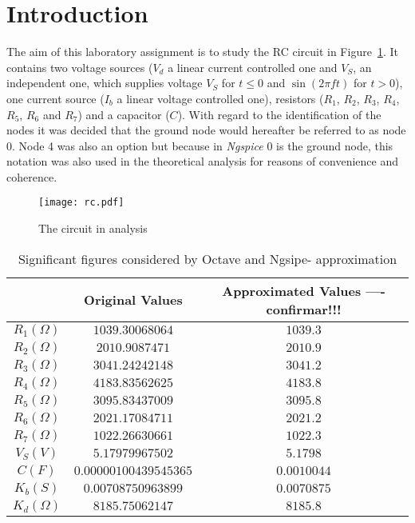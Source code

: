 \section{Introduction}
\label{sec:introduction}


The aim of this laboratory assignment is to study the RC circuit in Figure~\ref{fig:rc}. It contains two voltage sources ($V_d$ a linear current controlled one and $V_S$, an independent one, which supplies voltage $V_S$ for $t\leq0$ and $\sin (2 \pi f t)$ for $t>0$), one current source ($I_b$ a linear voltage controlled one), resistors ($R_1$, $R_2$, $R_3$, $R_4$, $R_5$, $R_6$ and $R_7$) and a capacitor ($C$).
With regard to the identification of the nodes it was decided that the ground node would hereafter be referred to as node 0. Node 4 was also an option but because in \textit{Ngspice} 0 is the ground node, this notation was also used in the theoretical analysis for reasons of convenience and coherence.


\begin{figure}[h] \centering
\texttt{[image: rc.pdf]}
\caption{The circuit in analysis}
\label{fig:rc}
\end{figure}




\begin{table}[hbt!]
  \centering
  \begin{tabular}{|c|c|c|}
    \hline
    &           \textbf{Original Values}        & \textbf{Approximated Values ---- confirmar!!!}\\ \hline
    $R_1 (\Omega)$   &  $   1039.30068064   $     & $1039.3$\\ \hline
    $R_2 (\Omega)$   &  $   2010.9087471    $      & $2010.9$\\ \hline
    $R_3 (\Omega)$   &  $   3041.24242148   $    & $3041.2$\\ \hline
    $R_4 (\Omega)$   &  $   4183.83562625   $     & $4183.8$\\ \hline
    $R_5 (\Omega)$   &  $   3095.83437009   $     & $3095.8$\\ \hline
    $R_6 (\Omega)$   &  $   2021.17084711   $     & $2021.2$\\ \hline
    $R_7 (\Omega)$   &  $   1022.26630661   $     & $1022.3$\\\hline
    $V_S (V)$   &  $   5.17979967502   $     & $5.1798$\\ \hline
    $C (F)$   &  $    0.00000100439545365     $     & $0.0010044$\\ \hline
    $K_b (S)$   &  $    0.00708750963899     $     & $0.0070875$\\ \hline
    $K_d (\Omega)$   &     $8185.75062147    $     & $8185.8$\\ \hline
  \end{tabular}
  \caption{Significant figures considered by Octave and Ngsipe- approximation} 
  \label{tab:ap}
\end{table}

